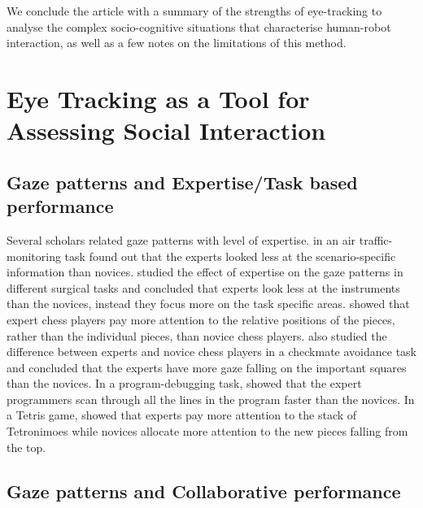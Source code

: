 \documentclass{sig-alternate}
\begin{document}
We conclude the article with a summary of the strengths of eye-tracking to
analyse the complex socio-cognitive situations that characterise human-robot
interaction, as well as a few notes on the limitations of this method.


\section{Eye Tracking as a Tool for Assessing Social Interaction}
\label{et_assessing}

\subsection{Gaze patterns and Expertise/Task based performance}

Several scholars related gaze patterns with level of expertise.
\cite{hasse2012measure} in an air traffic-monitoring task found out that the
experts looked less at the scenario-specific information than novices.
\cite{eivazi2012gaze, law2004eye, tien2010measuring} studied the effect of
expertise on the gaze patterns in different surgical tasks and concluded that
experts look less at the instruments than the novices, instead they focus more
on the task specific areas. \cite{reingold2001visual} showed that expert chess
players pay more attention to the relative positions of the pieces, rather than
the individual pieces, than novice chess players. \cite{blignaut2008visual} also
studied the difference between experts and novice chess players in a checkmate
avoidance task and concluded that the experts have more gaze falling on the
important squares than the novices. In a program-debugging task,
\cite{sharif2012eye} showed that the expert programmers scan through all the
lines in the program faster than the novices. In a Tetris game,
\cite{jermann2010using} showed that experts pay more attention to the stack of
Tetronimoes while novices allocate more attention to the new pieces falling from
the top.

\subsection{Gaze patterns and Collaborative performance}
\end{document}
